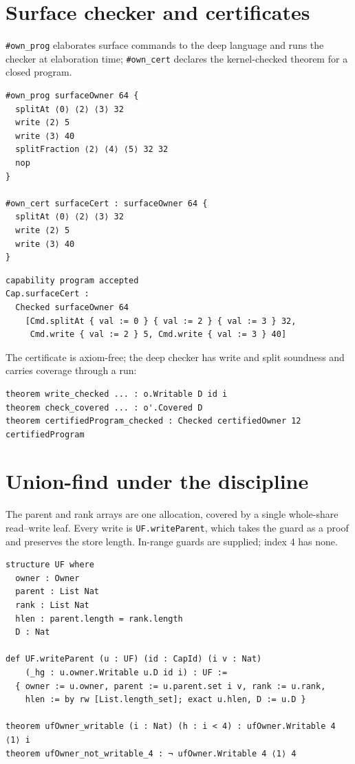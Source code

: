 \documentclass[10pt,a4paper]{article}
\newcommand{\file}[1]{\texttt{\small #1}}
\begin{document}
\section{Surface checker and certificates}

\texttt{\#own\_prog} elaborates surface commands to the deep language and runs the
checker at elaboration time; \texttt{\#own\_cert} declares the kernel-checked
theorem for a closed program.

\begin{lstlisting}[caption={\file{Cap/Surface.lean}, surface program and certificate.}]
#own_prog surfaceOwner 64 {
  splitAt ⟨0⟩ ⟨2⟩ ⟨3⟩ 32
  write ⟨2⟩ 5
  write ⟨3⟩ 40
  splitFraction ⟨2⟩ ⟨4⟩ ⟨5⟩ 32 32
  nop
}

#own_cert surfaceCert : surfaceOwner 64 {
  splitAt ⟨0⟩ ⟨2⟩ ⟨3⟩ 32
  write ⟨2⟩ 5
  write ⟨3⟩ 40
}
\end{lstlisting}

\begin{lstlisting}[style=out]
capability program accepted
Cap.surfaceCert :
  Checked surfaceOwner 64
    [Cmd.splitAt { val := 0 } { val := 2 } { val := 3 } 32,
     Cmd.write { val := 2 } 5, Cmd.write { val := 3 } 40]
\end{lstlisting}

The certificate is axiom-free; the deep checker has write and split soundness and
carries coverage through a run:

\begin{lstlisting}[caption={\file{Cap/Core.lean}, \file{Cap/Certify.lean}.}]
theorem write_checked ... : o.Writable D id i
theorem check_covered ... : o'.Covered D
theorem certifiedProgram_checked : Checked certifiedOwner 12 certifiedProgram
\end{lstlisting}

\section{Union-find under the discipline}

The parent and rank arrays are one allocation, covered by a single whole-share
read--write leaf. Every write is \texttt{UF.writeParent}, which takes the guard as a
proof and preserves the store length. In-range guards are supplied; index 4 has
none.

\begin{lstlisting}[caption={\file{Cap/UnionFind.lean}.}]
structure UF where
  owner : Owner
  parent : List Nat
  rank : List Nat
  hlen : parent.length = rank.length
  D : Nat

def UF.writeParent (u : UF) (id : CapId) (i v : Nat)
    (_hg : u.owner.Writable u.D id i) : UF :=
  { owner := u.owner, parent := u.parent.set i v, rank := u.rank,
    hlen := by rw [List.length_set]; exact u.hlen, D := u.D }

theorem ufOwner_writable (i : Nat) (h : i < 4) : ufOwner.Writable 4 ⟨1⟩ i
theorem ufOwner_not_writable_4 : ¬ ufOwner.Writable 4 ⟨1⟩ 4
\end{lstlisting}
\end{document}
